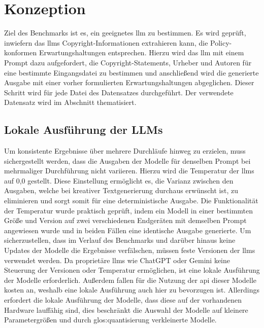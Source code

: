 
\section{Konzeption}\label{sec:konzeption-benchmark}

Ziel des Benchmarks ist es, ein geeignetes \gls{llm} zu bestimmen.
Es wird geprüft, inwiefern das \glspl{llm} Copyright-Informationen extrahieren kann, die Policy-konformen Erwartungshaltungen entsprechen.
Hierzu wird das \gls{llm} mit einem Prompt dazu aufgefordert, die Copyright-Statements, Urheber und Autoren für eine bestimmte Eingangsdatei zu bestimmen und anschließend wird die generierte Ausgabe mit einer vorher formulierten Erwartungshaltungen abgeglichen.
Dieser Schritt wird für jede Datei des Datensatzes durchgeführt.
Der verwendete Datensatz wird im Abschnitt  thematisiert.


\subsection{Lokale Ausführung der LLMs}\label{subsec:lokale-ausfuehrung}

Um konsistente Ergebnisse über mehrere Durchläufe hinweg zu erzielen, muss sichergestellt werden, dass die Ausgaben der Modelle für denselben Prompt bei mehrmaliger Durchführung nicht variieren.
Hierzu wird die Temperatur der \glspl{llm} auf 0,0 gestellt.
Diese Einstellung ermöglicht es, die Varianz zwischen den Ausgaben, welche bei kreativer Textgenerierung durchaus erwünscht ist, zu eliminieren und sorgt somit für eine deterministische Ausgabe.
Die Funktionalität der Temperatur wurde praktisch geprüft, indem ein Modell in einer bestimmten Größe und Version auf zwei verschiedenen Endgeräten mit demselben Prompt angewiesen wurde und in beiden Fällen eine identische Ausgabe generierte.
Um sicherzustellen, dass im Verlauf des Benchmarks und darüber hinaus keine Updates der Modelle die Ergebnisse verfälschen, müssen feste Versionen der \glspl{llm} verwendet werden.
Da proprietäre \glspl{llm} wie ChatGPT oder Gemini keine Steuerung der Versionen oder Temperatur ermöglichen, ist eine lokale Ausführung der Modelle erforderlich.
Außerdem fallen für die Nutzung der \gls{api} dieser Modelle kosten an, weshalb eine lokale Ausführung auch hier zu bevorzugen ist.
Allerdings erfordert die lokale Ausführung der Modelle, dass diese auf der vorhandenen Hardware lauffähig sind, dies beschränkt die Auswahl der Modelle auf kleinere Parametergrößen und durch \gls{glos:quantisierung} verkleinerte Modelle.

